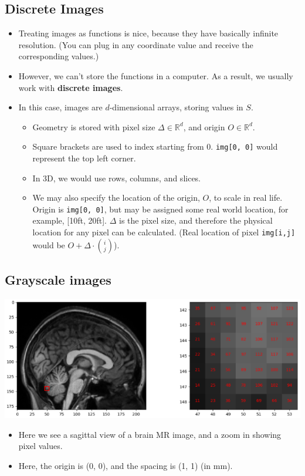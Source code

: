 \documentclass[10pt]{article}
\newcommand{\R}{\mathbb{R}}
\begin{document}
\subsection*{Discrete Images}
\begin{itemize}
    \item Treating images as functions is nice, because they have basically infinite resolution.  (You can plug in any coordinate value and receive the corresponding values.)
    \item However, we can't store the functions in a computer.  As a result, we usually work with \textbf{discrete images}.
    \item In this case, images are $d$-dimensional arrays, storing values in $S$.
    \begin{itemize}
        \item Geometry is stored with pixel size $\Delta \in \R^d$, and origin $O \in \R^d$.
        \item Square brackets are used to index starting from 0. \texttt{img[0, 0]} would represent the top left corner.
        \item In 3D, we would use rows, columns, and slices.
        \item We may also specify the location of the origin, $O$, to scale in real life.  Origin is \texttt{img[0, 0]}, but may be assigned some real world location, for example, [10ft, 20ft].  $\Delta$ is the pixel size, and therefore the physical location for any pixel can be calculated.  (Real location of pixel \texttt{img[i,j]} would be $O + \Delta \cdot {i \choose j}$).
    \end{itemize}
\end{itemize}

\subsection*{Grayscale images}
\begin{center}
    \includegraphics[scale=1]{W1_4.png}
\end{center}
\begin{itemize}
    \item Here we see a sagittal view of a brain MR image, and a zoom in showing pixel values.
    \item Here, the origin is (0, 0), and the spacing is (1, 1) (in mm).
\end{itemize}
\end{document}
